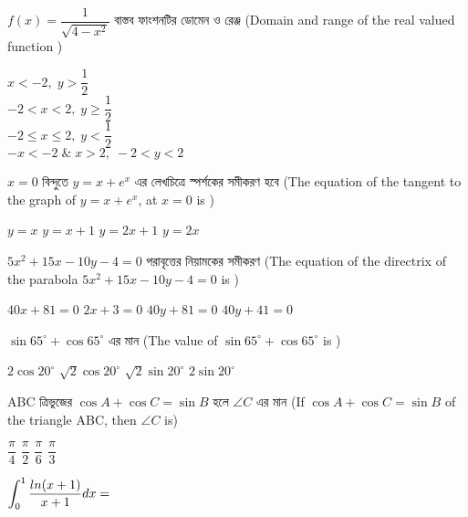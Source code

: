 \documentclass[addpoints]{exam}
\begin{document}
\begin{questions}
\question  $ f(x) = \dfrac{1}{\sqrt{4-x^{2}}} $ বাস্তব ফাংশনটির ডোমেন ও রেঞ্জ (Domain and range of the real valued function ) 

\begin{oneparchoices}
\choice $ x<-2,\; y>\dfrac{1}{2} $\\
\choice $ -2<x<2,\; y\ge \dfrac{1}{2} $\\
\choice $ -2\le x\le 2,\; y<\dfrac{1}{2} $\\
\choice $ -x<-2\; \&\; x>2,\;  -2<y<2$
\end{oneparchoices}

\question  $ x=0 $ বিন্দুতে $ y = x + e^{x} $ এর লেখচিত্রে স্পর্শকের সমীকরণ হবে (The equation of the tangent to the graph of $ y = x + e^{x} $, at $x=0$ is )

\begin{oneparchoices}
\choice $ y=x $
\choice $ y=x+1 $
\choice $ y=2x+1 $
\choice $ y=2x $

\end{oneparchoices}

\question  $ 5x^2 +15x -10y -4 =0 $ পরাবৃত্তের নিয়ামকের সমীকরণ (The equation of the directrix of the parabola $ 5x^2 +15x -10y -4 =0 $ is ) 

\begin{oneparchoices}
\choice $ 40x+81 = 0 $
\choice $ 2x+3 = 0 $
\choice $ 40y+81= 0 $
\choice $ 40y +41 =0 $

\end{oneparchoices}

\question $ \sin 65^{\circ} + \cos 65^{\circ} $ এর মান (The value of $ \sin 65^{\circ} + \cos 65^{\circ} $ is )

\begin{oneparchoices}
\choice $ 2\cos 20^{\circ} $
\choice $ \sqrt{2}\cos 20^{\circ} $
\choice $ \sqrt{2}\sin 20^{\circ} $
\choice  $ 2\sin 20^{\circ} $

\end{oneparchoices}

\question  ABC ত্রিভুজের $ \cos A + \cos C = \sin B $ হলে $ \angle C $ এর মান (If $ \cos A + \cos C = \sin B $ of the triangle ABC, then $ \angle C $ is)

\begin{oneparchoices}
\choice $ \dfrac{\pi}{4} $
\choice $ \dfrac{\pi}{2} $
\choice $ \dfrac{\pi}{6} $
\choice $ \dfrac{\pi}{3} $

\end{oneparchoices}

\question  $ \mathlarger{\int_{0}^{1}\dfrac{ln(x+1)}{x+1} dx =} $


\end{questions}
\end{document}
